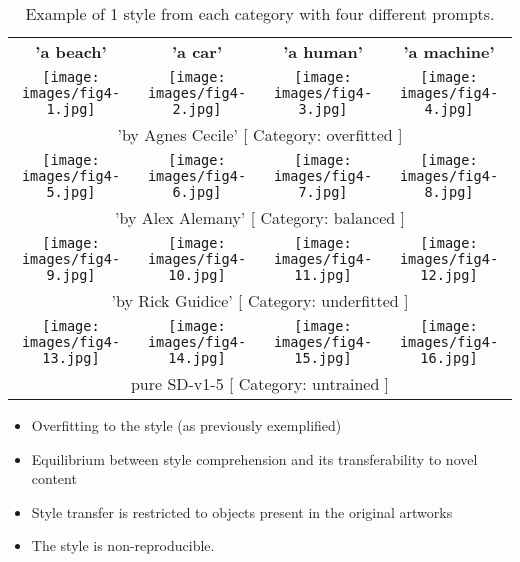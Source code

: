 \documentclass[12pt, letterpaper]{article}
\begin{document}
\begin{table}[h!]
    \centering
    \begin{tabularx}{\textwidth}{cccc}
        \textbf{'a beach'} & \textbf{'a car'} & \textbf{'a human'} & \textbf{'a machine'} \\
        \texttt{[image: images/fig4-1.jpg]} & \texttt{[image: images/fig4-2.jpg]} & \texttt{[image: images/fig4-3.jpg]} & \texttt{[image: images/fig4-4.jpg]} \\
        \multicolumn{4}{c}{'by Agnes Cecile' [ Category: overfitted ]} \\
        \texttt{[image: images/fig4-5.jpg]} & \texttt{[image: images/fig4-6.jpg]} & \texttt{[image: images/fig4-7.jpg]} & \texttt{[image: images/fig4-8.jpg]} \\
        \multicolumn{4}{c}{'by Alex Alemany' [ Category: balanced ]} \\
        \texttt{[image: images/fig4-9.jpg]} & \texttt{[image: images/fig4-10.jpg]} & \texttt{[image: images/fig4-11.jpg]} & \texttt{[image: images/fig4-12.jpg]} \\
        \multicolumn{4}{c}{'by Rick Guidice' [ Category: underfitted ]} \\
        \texttt{[image: images/fig4-13.jpg]} & \texttt{[image: images/fig4-14.jpg]} & \texttt{[image: images/fig4-15.jpg]} & \texttt{[image: images/fig4-16.jpg]} \\
        \multicolumn{4}{c}{pure SD-v1-5 [ Category: untrained ]} \\
    \end{tabularx}
    \caption{Example of 1 style from each category with four different prompts.}
    \label{tab:table_2}
\end{table}

\begin{itemize}
    \item Overfitting to the style (as previously exemplified)
    \item Equilibrium between style comprehension and its transferability to novel content
    \item Style transfer is restricted to objects present in the original artworks
    \item The style is non-reproducible.
\end{itemize}
\end{document}

